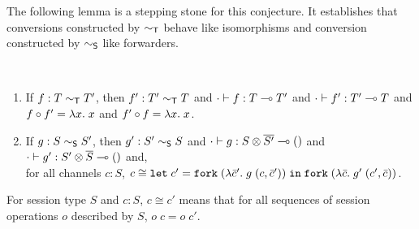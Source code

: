 The following lemma is a stepping stone for this conjecture. It
establishes that conversions constructed by $\eqt$ behave like
isomorphisms and conversion constructed by $\eqs$ like forwarders.
\begin{conjecture}~\\[-\baselineskip]
  \label{lemma:conversion}
  \begin{enumerate}
  \item If $f : T \eqt T'$,
    then $f' : T' \eqt T$
    and $\typing[\CNil]{f}{\TFun T{T'}}$
    and  $\typing[\CNil]{f'}{\TFun {T'}T}$
    and  $f \circ f' = \ELam x x$
    and  $f' \circ f = \ELam x x$.
  \item If $g : S \eqs S'$,
    then $g' : S' \eqs S$
    and $\typing[\CNil]{g}{\TFun {\TPair {S} {\TDual{S'}}} \TUnit}$
    and $\typing[\CNil]{g'}{\TFun {\TPair {S'} {\TDual{S}}} \TUnit}$
    and,\\
    for all channels $c : S$,  $c \cong \ELet{c'}{\EFork{( \ELam {\bar c'} g \; (c, \bar c')) }}{\EFork{( \ELam {\bar c} g' \; (c', \bar c)) }} $.
  \end{enumerate}
\end{conjecture}
For session type $S$ and $c:S$, $c \cong c'$ means that for all
sequences of session operations $o$ described by $S$, $o\; c = o\; c'$.


